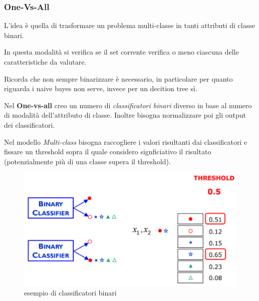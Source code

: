 \subsubsection{One-Vs-All}
L'idea \`e quella di trasformare un problema multi-classe in tanti attributi di classe binari. 

In questa modalit\`a si verifica se il set corrente verifica o meno ciascuna delle caratteristiche da valutare. 

Ricorda che non sempre binarizzare \`e necessario, in particolare per quanto riguarda i naive bayes non serve, invece per un decition tree s\`i. 

Nel \textbf{One-vs-all} creo un numero di \textit{classificatori binari} diverso in base al numero di modalit\`a dell'attributo di classe. Inoltre bisogna normalizzare poi gli output dei classificatori. 

Nel modello \textit{Multi-class} bisogna raccogliere i valori risultanti dai classificatori e fissare un threshold sopra il quale considero signficiativo il risultato (potenzialmente pi\`u di una classe supera il threshold).
\begin{figure}[H]
	\centering
	\includegraphics[height=0.4 \linewidth]{classification/pict/es_no_binary_classification.png}
	\caption{esempio di classificatori binari}
\end{figure} 
